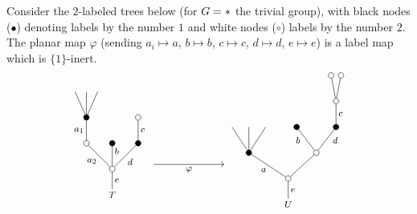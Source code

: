 \documentclass[a4paper,10pt]{article}%
\begin{document}
\begin{example}\label{LABELEDTREES EX}
  Consider the $2$-labeled trees below (for $G=\**$ the trivial group), with black nodes ($\bullet$) denoting labels by the number $1$ and white nodes ($\circ$) labels by the number $2$.
  The planar map $\varphi$ (sending $a_i\mapsto a$, 
  $b \mapsto b$, $c \mapsto c$, $d \mapsto d$, $e \mapsto e$) is a label map which is $\{1\}$-inert.
  \begin{equation}\label{SUBSDATUMTREESLAB EQ}
    \begin{tikzpicture}[grow=up,auto,level distance=2.1em,
      every node/.style = {font=\footnotesize,inner sep=2pt},
      dummy/.style={circle,draw,inner sep=0pt,minimum size=1.75mm}]
      \begin{scope}[level distance=2.3em]
	\tikzstyle{level 2}=[sibling distance=3.5em]%
	\tikzstyle{level 3}=[sibling distance=2.25em]%
	\tikzstyle{level 4}=[sibling distance=1.25em]%
	\tikzstyle{level 5}=[sibling distance=0.875em]%
        \node at (5.5,0) {$U$}
        child{node [dummy] {}
          child[sibling distance =5em]{node [dummy] {}
            child[sibling distance =3.5em]{node [dummy,fill=black] {}
              child{node [dummy] {}
                child{node [dummy] {}}
                child{node [dummy] {}}
                edge from parent node [swap] {$c$}}
              edge from parent node [swap, near end] {$d$}}
            child[sibling distance =3.5em]{node [dummy,fill=black] {}
              edge from parent node [near end] {$b$}}
          }
          child[sibling distance =7em]{node [dummy,fill=black] {}
            child[sibling distance =1.5em]
            child[sibling distance =1.5em]
            child[sibling distance =1.5em]
            edge from parent node {$a$}}
          edge from parent node [swap] {$e$}};
      \end{scope}
      \begin{scope}[level distance=2.3em]
	\tikzstyle{level 2}=[sibling distance=2.3em]%
	\tikzstyle{level 4}=[sibling distance=1em]%
        \node at (0,0.3) {$T$}
        child{node [dummy] {}
          child{node [dummy,fill=black] {}
            child{node [dummy] {}
              edge from parent node [swap] {$c$}}	
            edge from parent node [swap] {$d$}}
          child{node [dummy,fill=black] {}
            edge from parent node [near end,swap] {$b$}}
          child{node [dummy] {}
            child{node [dummy,fill=black] {}
              child
              child
              child
              edge from parent node {$a_1$}}
            edge from parent node {$a_2$}}
          edge from parent node [swap] {$e$}};
      \end{scope}
      \draw [->] (1.3,1.25) -- node[swap] {$\varphi$} (3.5,1.25);
    \end{tikzpicture}
  \end{equation}
\end{example}
\end{document}
